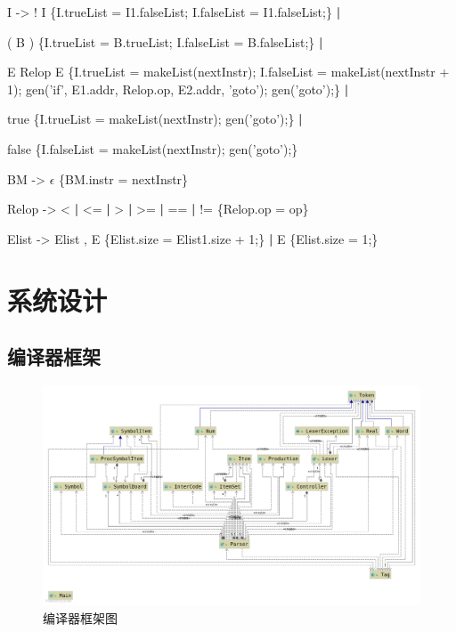 \documentclass{ML}
\begin{document}
\begin{enumerate}
{    \item I -> ! I {\color{red}\{I.trueList = I1.falseList; I.falseList = I1.falseList;\}} \textbf{|}
    
    \hspace{1cm}( B ) {\color{red}\{I.trueList = B.trueList; I.falseList = B.falseList;\}} \textbf{|}
    
    \hspace{1cm}E Relop E {\color{red}\{I.trueList = makeList(nextInstr); I.falseList = makeList(nextInstr + 1); gen('if', E1.addr, Relop.op, E2.addr, 'goto'); gen('goto');\}} \textbf{|}
    
    \hspace{1cm}true {\color{red}\{I.trueList = makeList(nextInstr); gen('goto');\}} \textbf{|}
    
    \hspace{1cm}false {\color{red}\{I.falseList = makeList(nextInstr); gen('goto');\}}
    \vspace{0.5cm}
    
    \item BM -> $\epsilon$ {\color{red}\{BM.instr = nextInstr\}}
    \vspace{0.5cm}
    
    \item Relop -> < \textbf{|} <= \textbf{|} > \textbf{|} >= \textbf{|} == \textbf{|} != {\color{red}\{Relop.op = op\}}
    \vspace{0.5cm}
    
    \item Elist -> Elist , E {\color{red}\{Elist.size = Elist1.size + 1;\}} \textbf{|}
         E {\color{red}\{Elist.size = 1;\}}
    }
\end{enumerate}
\section{系统设计}
\subsection{编译器框架}
\begin{figure}[H]
    \centering
    \includegraphics[width=1\linewidth]{media/Compiler.png}
    \caption{编译器框架图}\label{fig:compiler}
\end{figure}
\end{document}
